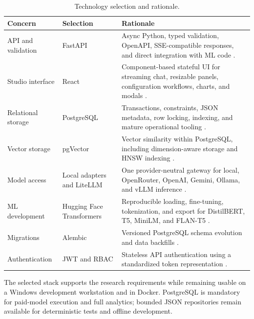 \begin{table}[H]
  \centering
  \caption{Technology selection and rationale.}
  \label{tab:technology-selection}
  \begin{tabularx}{\textwidth}{p{}p{}X}
    \toprule
    Concern & Selection & Rationale\\
    \midrule
    API and validation & FastAPI & Async Python, typed validation, OpenAPI,
    SSE-compatible responses, and direct integration with ML code
    \cite{fastapi2026}.\\
    Studio interface & React & Component-based stateful UI for streaming chat,
    resizable panels, configuration workflows, charts, and modals
    \cite{react2026}.\\
    Relational storage & PostgreSQL & Transactions, constraints, JSON metadata,
    row locking, indexing, and mature operational tooling
    \cite{postgresql2026}.\\
    Vector storage & pgVector & Vector similarity within PostgreSQL, including
    dimension-aware storage and HNSW indexing \cite{pgvector2026}.\\
    Model access & Local adapters and LiteLLM & One provider-neutral gateway for
    local, OpenRouter, OpenAI, Gemini, Ollama, and vLLM inference
    \cite{litellm2026}.\\
    ML development & Hugging Face Transformers & Reproducible loading,
    fine-tuning, tokenization, and export for DistilBERT, T5, MiniLM, and
    FLAN-T5 \cite{wolf2020transformers}.\\
    Migrations & Alembic & Versioned PostgreSQL schema evolution and data
    backfills \cite{alembic2026}.\\
    Authentication & JWT and RBAC & Stateless API authentication using a
    standardized token representation \cite{rfc7519}.\\
    \bottomrule
  \end{tabularx}
\end{table}

The selected stack supports the research requirements while remaining usable
on a Windows development workstation and in Docker. PostgreSQL is mandatory
for paid-model execution and full analytics; bounded JSON repositories remain
available for deterministic tests and offline development.
